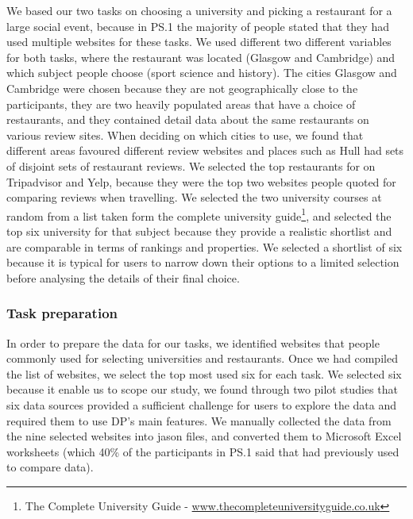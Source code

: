 \documentclass{sigchi}
\begin{document}
We based our two tasks on choosing a university and picking a restaurant for a large social event, because in PS.1 the majority of people stated that they had used multiple websites for these tasks.  We used different two different variables for both tasks, where the restaurant was located (Glasgow and Cambridge) and which subject people choose (sport science and history).  The cities Glasgow and Cambridge were chosen because they are not geographically close to the participants, they are two heavily populated areas that have a choice of restaurants, and they contained detail data about the same restaurants on various review sites.  When deciding on which cities to use, we found that different areas favoured different review websites and places such as Hull had sets of disjoint sets of restaurant reviews.  We selected the top restaurants for on Tripadvisor and Yelp, because they were the top two websites people quoted for comparing reviews when travelling.  We selected the two university courses at random from a list taken form the complete university guide\footnote{The Complete University Guide - \url{www.thecompleteuniversityguide.co.uk}}, and selected the top six university for that subject because they provide a realistic shortlist and are comparable in terms of rankings and properties.   We selected a shortlist of six because it is typical for users to narrow down their options to a limited selection before analysing the details of their final choice.

\subsubsection{Task preparation}
In order to prepare the data for our tasks, we identified websites that people commonly used for selecting universities and restaurants.  Once we had compiled the list of websites, we select the top most used six for each task.  We selected six because it enable us to scope our study, we found through two pilot studies that six data sources provided a sufficient challenge for users to explore the data and required them to use DP's main features.  We manually collected the data from the nine selected websites into jason files, and converted them to Microsoft Excel worksheets (which 40\% of the participants in PS.1 said that had previously used to compare data).
\end{document}
